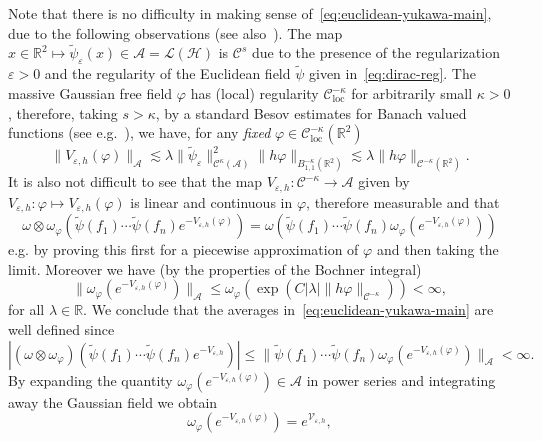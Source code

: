 \documentclass{article}
\newcommand{\tmop}[1]{\ensuremath{\operatorname{#1}}}
\newcommand{\tmtextit}[1]{{\itshape{#1}}}
\begin{document}
Note that there is no difficulty in making sense
of~{\eqref{eq:euclidean-yukawa-main}}, due to the following observations (see
also~{\cite{osterwalder_euclidean_1973-2}}). The map $x \in \mathbb{R}^2
\mapsto \tilde{\psi}_{\varepsilon} (x) \in \mathcal{A}= \mathcal{L}
(\mathcal{H})$ is $\mathcal{C}^s$ due to the presence of the regularization
$\varepsilon > 0$ and the regularity of the Euclidean field $\tilde{\psi}$
given in~{\eqref{eq:dirac-reg}}. The massive Gaussian free field $\varphi$ has
(local) regularity $\mathcal{C}^{- \kappa}_{\tmop{loc}}$ for arbitrarily small
$\kappa > 0$, therefore, taking $s > \kappa$, by a standard Besov estimates
for Banach valued functions (see e.g.~{\cite{Amann1997,Amann2019}}), we have,
for any \tmtextit{fixed} $\varphi \in \mathcal{C}^{- \kappa}_{\tmop{loc}}
(\mathbb{R}^2)$
\[ \| V_{\varepsilon, h} (\varphi) \|_{\mathcal{A}} \lesssim \lambda \|
   \tilde{\psi}_{\varepsilon} \|^2_{\mathcal{C}^{\kappa} (\mathcal{A})} \| h
   \varphi \|_{B^{- \kappa}_{1, 1} (\mathbb{R}^2)} \lesssim \lambda \| h
   \varphi \|_{\mathcal{C}^{- \kappa} (\mathbb{R}^2)} . \]
It is also not difficult to see that the map $V_{\varepsilon, h} :
\mathcal{C}^{- \kappa} \rightarrow \mathcal{A}$ given by $V_{\varepsilon, h} :
\varphi \mapsto V_{\varepsilon, h} (\varphi)$ is linear and continuous in
$\varphi$, therefore measurable and that
\[ \omega \otimes \omega_{\varphi} (\tilde{\psi} (f_1) \cdots \tilde{\psi}
   (f_n) e^{- V_{\varepsilon, h} (\varphi)}) = \omega (\tilde{\psi} (f_1)
   \cdots \tilde{\psi} (f_n) \omega_{\varphi} (e^{- V_{\varepsilon, h}
   (\varphi)})) \]
e.g. by proving this first for a piecewise approximation of $\varphi$ and then
taking the limit. Moreover we have (by the properties of the Bochner integral)
\[ \| \omega_{\varphi} (e^{- V_{\varepsilon, h} (\varphi)}) \|_{\mathcal{A}}
   \leqslant \omega_{\varphi} (\exp (C | \lambda | \| h \varphi
   \|_{\mathcal{C}^{- \kappa}})) < \infty, \]
for all $\lambda \in \mathbb{R}$. We conclude that the averages
in~{\eqref{eq:euclidean-yukawa-main}} are well defined since
\[ | (\omega \otimes \omega_{\varphi}) (\tilde{\psi} (f_1) \cdots
   \tilde{\psi} (f_n) e^{- V_{\varepsilon, h}}) | \leqslant \| \tilde{\psi}
   (f_1) \cdots \tilde{\psi} (f_n) \omega_{\varphi} (e^{- V_{\varepsilon, h}
   (\varphi)}) \|_{\mathcal{A}} < \infty . \]
By expanding the quantity $\omega_{\varphi} (e^{- V_{\varepsilon, h}
(\varphi)}) \in \mathcal{A}$ in power series and integrating away the Gaussian
field we obtain
\[ \omega_{\varphi} (e^{- V_{\varepsilon, h} (\varphi)}) =
   e^{\mathcal{V}_{\varepsilon, h}}, \]
\end{document}
